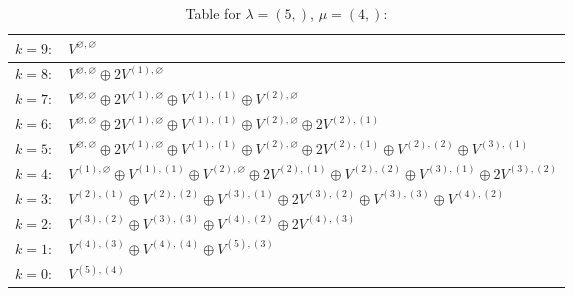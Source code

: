 \documentclass[a4paper,12pt]{article}
\begin{document}
\renewcommand{\arraystretch}{1.6} 
\begin{table}[H]
\centering
\caption{Table for $\lambda = (5,)$, $\mu = (4,)$:}
\begin{tabular}{|>{\centering\arraybackslash}p{15cm}|}
\hline
 $k = 9: \quad V^{\varnothing, \varnothing} $ \\ \hline
 $k = 8: \quad V^{\varnothing, \varnothing} \oplus 2 V^{(1), \varnothing} $ \\ \hline
 $k = 7: \quad V^{\varnothing, \varnothing} \oplus 2 V^{(1), \varnothing} \oplus V^{(1), (1)} \oplus V^{(2), \varnothing} $ \\ \hline
 $k = 6: \quad V^{\varnothing, \varnothing} \oplus 2 V^{(1), \varnothing} \oplus V^{(1), (1)} \oplus V^{(2), \varnothing} \oplus 2 V^{(2), (1)} $ \\ \hline
 $k = 5: \quad V^{\varnothing, \varnothing} \oplus 2 V^{(1), \varnothing} \oplus V^{(1), (1)} \oplus V^{(2), \varnothing} \oplus 2 V^{(2), (1)} \oplus V^{(2), (2)} \oplus V^{(3), (1)} $ \\ \hline
 $k = 4: \quad V^{(1), \varnothing} \oplus V^{(1), (1)} \oplus V^{(2), \varnothing} \oplus 2 V^{(2), (1)} \oplus V^{(2), (2)} \oplus V^{(3), (1)} \oplus 2 V^{(3), (2)} $ \\ \hline
 $k = 3: \quad V^{(2), (1)} \oplus V^{(2), (2)} \oplus V^{(3), (1)} \oplus 2 V^{(3), (2)} \oplus V^{(3), (3)} \oplus V^{(4), (2)} $ \\ \hline
 $k = 2: \quad V^{(3), (2)} \oplus V^{(3), (3)} \oplus V^{(4), (2)} \oplus 2 V^{(4), (3)} $ \\ \hline
 $k = 1: \quad V^{(4), (3)} \oplus V^{(4), (4)} \oplus V^{(5), (3)} $ \\ \hline
 $k = 0: \quad V^{(5), (4)} $ \\ \hline
\end{tabular}
\end{table}
\end{document}
